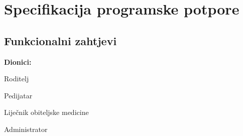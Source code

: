 \chapter{Specifikacija programske potpore}
	\section{Funkcionalni zahtjevi}
			\noindent \textbf{Dionici:}
			\begin{packed_enum}
				\item Roditelj
				\item Pedijatar
                \item Liječnik obiteljske medicine
                \item Administrator
			\end{packed_enum}
			
